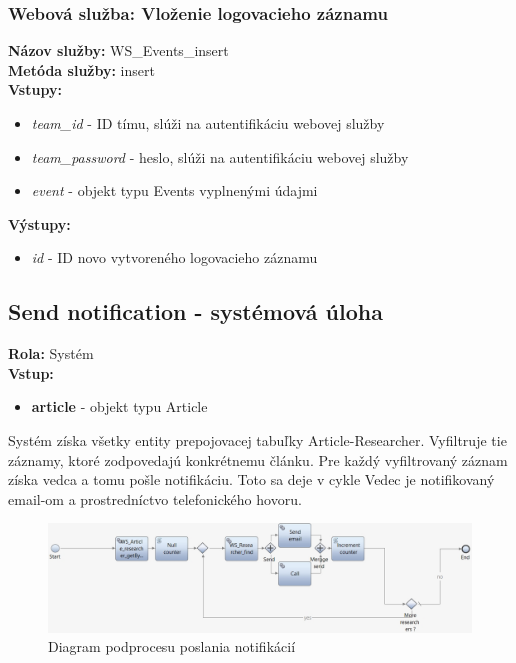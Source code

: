 \documentclass[10pt,oneside,slovak,a4paper]{article}
\begin{document}
\subsubsection{Webová služba: Vloženie logovacieho záznamu}
\textbf{Názov služby:} WS\_Events\_insert\\
\textbf{Metóda služby:} insert\\
\textbf{Vstupy:}
	\begin{itemize}
		\item \textit{team\_id} - ID tímu, slúži na autentifikáciu webovej služby
		\item \textit{team\_password} - heslo, slúži na autentifikáciu webovej služby
		\item \textit{event} - objekt typu Events vyplnenými údajmi
	\end{itemize}
\textbf{Výstupy:}
	\begin{itemize}
		\item \textit{id} - ID novo vytvoreného logovacieho záznamu
	\end{itemize}

\subsection{Send notification - systémová úloha}
\textbf{Rola:} Systém\\
\textbf{Vstup:}

\begin{itemize}
\item \textbf{article} - objekt typu Article
\end{itemize}

Systém získa všetky entity prepojovacej tabuľky Article-Researcher. Vyfiltruje tie záznamy, ktoré zodpovedajú konkrétnemu článku. Pre každý vyfiltrovaný záznam získa vedca a tomu pošle notifikáciu. Toto sa deje v cykle Vedec je notifikovaný email-om a prostredníctvo telefonického hovoru.

\begin{figure} [H]
\centering
\includegraphics[scale=0.4]{diagrams/diagNotification.jpg} 
\caption{Diagram podprocesu poslania notifikácií}
\end{figure}
\end{document}
